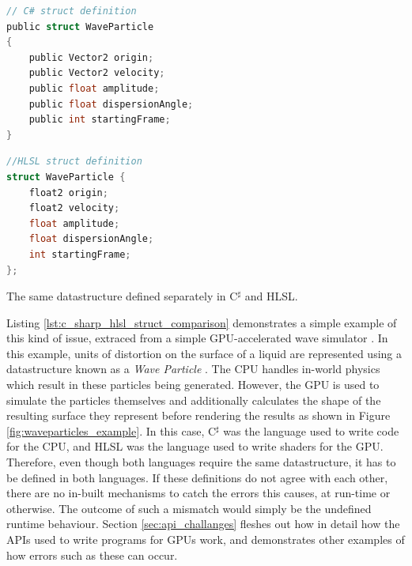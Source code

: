 \documentclass[a4paper,12pt,twoside,openright]{report}
\begin{document}
\begin{lstfloat}
\begin{lstlisting}[language=C]
// C# struct definition
public struct WaveParticle
{
    public Vector2 origin;
    public Vector2 velocity;
    public float amplitude;
    public float dispersionAngle;
    public int startingFrame;
}
\end{lstlisting}
\begin{lstlisting}[language=C]
//HLSL struct definition
struct WaveParticle {
    float2 origin;
    float2 velocity;
    float amplitude;
    float dispersionAngle;
    int startingFrame;
};
\end{lstlisting}
\label{lst:c_sharp_hlsl_struct_comparison}
\caption{The same datastructure defined separately in C$^\sharp$ and HLSL.}
\end{lstfloat}

Listing \ref{lst:c_sharp_hlsl_struct_comparison} demonstrates a simple example
of this kind of issue, extraced from a simple GPU-accelerated wave simulator
\cite{WaveParticlesGPU}. In this example, units of distortion on the surface of
a liquid are represented using a datastructure known as a \textit{Wave
Particle} \cite{WaveParticlesOriginalPaper}. The CPU handles in-world physics
which result in these particles being generated. However, the GPU is used to
simulate the particles themselves and additionally calculates the shape of the
resulting surface they represent before rendering the results as shown in
Figure \ref{fig:waveparticles_example}. In this case, C$^\sharp$ was the
language used to write code for the CPU, and HLSL was the language used to
write shaders for the GPU. Therefore, even though both languages require the
same datastructure, it has to be defined in both languages. If these
definitions do not agree with each other, there are no in-built mechanisms to
catch the errors this causes, at run-time or otherwise. The outcome of such a
mismatch would simply be the undefined runtime behaviour. Section
\ref{sec:api_challanges} fleshes out how in detail how the APIs used to write
programs for GPUs work, and demonstrates other examples of how errors such as
these can occur.
\end{document}
